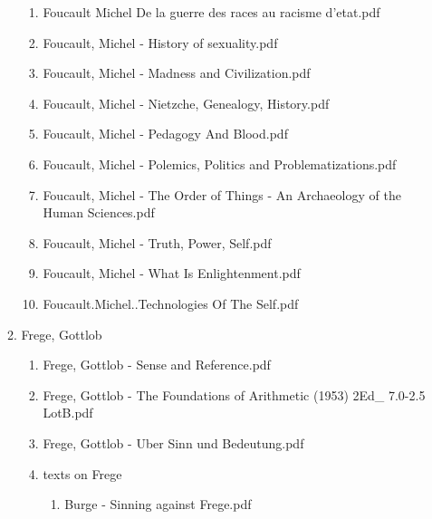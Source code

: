 \documentclass[11pt]{article}
\begin{document}
\begin{enumerate}
\begin{enumerate}
\begin{enumerate}
\item Foucault Michel De la guerre des races au racisme d'etat.pdf
\label{sec-1-1-1-1-34-25-33-2}

\item Foucault, Michel - History of sexuality.pdf
\label{sec-1-1-1-1-34-25-33-3}

\item Foucault, Michel - Madness and Civilization.pdf
\label{sec-1-1-1-1-34-25-33-4}

\item Foucault, Michel - Nietzche, Genealogy, History.pdf
\label{sec-1-1-1-1-34-25-33-5}

\item Foucault, Michel - Pedagogy And Blood.pdf
\label{sec-1-1-1-1-34-25-33-6}

\item Foucault, Michel - Polemics, Politics and Problematizations.pdf
\label{sec-1-1-1-1-34-25-33-7}

\item Foucault, Michel - The Order of Things - An Archaeology of the Human Sciences.pdf
\label{sec-1-1-1-1-34-25-33-8}

\item Foucault, Michel - Truth, Power, Self.pdf
\label{sec-1-1-1-1-34-25-33-9}

\item Foucault, Michel - What Is Enlightenment.pdf
\label{sec-1-1-1-1-34-25-33-10}

\item Foucault.Michel..Technologies Of The Self.pdf
\label{sec-1-1-1-1-34-25-33-11}
\end{enumerate}

\item Frege, Gottlob
\label{sec-1-1-1-1-34-25-34}
\begin{enumerate}
\item Frege, Gottlob - Sense and Reference.pdf
\label{sec-1-1-1-1-34-25-34-1}

\item Frege, Gottlob - The Foundations of Arithmetic (1953) 2Ed\_ 7.0-2.5 LotB.pdf
\label{sec-1-1-1-1-34-25-34-2}

\item Frege, Gottlob - Uber Sinn und Bedeutung.pdf
\label{sec-1-1-1-1-34-25-34-3}

\item texts on Frege
\label{sec-1-1-1-1-34-25-34-4}
\begin{enumerate}
\item Burge - Sinning against Frege.pdf
\label{sec-1-1-1-1-34-25-34-4-1}


\end{enumerate}
\end{enumerate}
\end{enumerate}
\end{enumerate}
\end{document}
